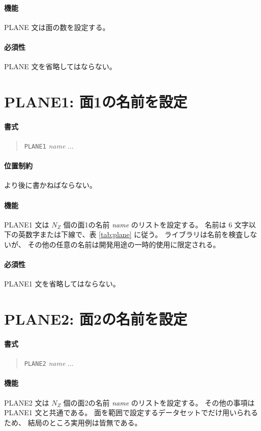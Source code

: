 \paragraph{機能}
PLANE 文は面の数を設定する。
\paragraph{必須性}
PLANE 文を省略してはならない。

\section{PLANE1: 面1の名前を設定}
\label{sec:def:PLANE1}
\paragraph{書式}
\begin{quote}
{\tt PLANE1} {\it name} ...
\end{quote}
\paragraph{位置制約}
 より後に書かねばならない。
\paragraph{機能}
PLANE1 文は $N_Z$ 個の面1の名前 {\it name} のリストを設定する。
名前は 6 文字以下の英数字または下線で、表 \ref{tab:plane} に従う。
ライブラリは名前を検査しないが、
その他の任意の名前は開発用途の一時的使用に限定される。
\paragraph{必須性}
PLANE1 文を省略してはならない。

\section{PLANE2: 面2の名前を設定}
\label{sec:def:PLANE2}
\paragraph{書式}
\begin{quote}
{\tt PLANE2} {\it name} ...
\end{quote}
\paragraph{機能}
PLANE2 文は $N_Z$ 個の面2の名前 {\it name} のリストを設定する。
その他の事項は PLANE1 文と共通である。
面を範囲で設定するデータセットでだけ用いられるため、
結局のところ実用例は皆無である。
